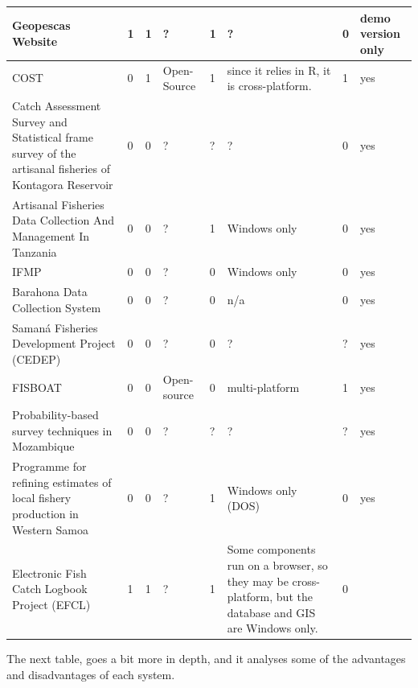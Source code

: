 \documentclass[11pt]{article} %
\begin{document}
\begin{center}
\begin{supertabular}{ | p{0.1\textwidth} | p{0.05\textwidth} | p{0.05\textwidth} | p{0.05\textwidth} | p{0.05\textwidth} | p{0.2\textwidth} | p{0.05\textwidth} | p{0.05\textwidth} |}
Geopescas Website & 1 & 1 & ? & 1 & ? & 0 & demo version only \\ \hline
COST & 0 & 1 & Open-Source & 1 & since it relies in R, it is cross-platform. & 1 & yes \\ \hline
Catch Assessment Survey and Statistical frame survey of the artisanal fisheries of Kontagora Reservoir & 0 & 0 & ? &  & ? & 0 & yes \\ \hline
Artisanal Fisheries Data Collection And Management In Tanzania & 0 & 0 & ? & 1 & Windows only & 0 & yes \\ \hline
IFMP & 0 & 0 & ? & 0 & Windows only & 0 & yes \\ \hline
Barahona Data Collection System & 0 & 0 & ? & 0 & n/a & 0 & yes \\ \hline
Samaná Fisheries Development Project (CEDEP) & 0 & 0 & ? & 0 & ? &  & yes \\ \hline
FISBOAT & 0 & 0 & Open-source & 0 & multi-platform & 1 & yes \\ \hline
Probability-based survey techniques in Mozambique & 0 & 0 & ? &  & ? &  & yes \\ \hline
Programme for refining estimates of local fishery production in Western Samoa & 0 & 0 & ? & 1 & Windows only (DOS) & 0 & yes \\ \hline
Electronic Fish Catch Logbook Project (EFCL) & 1 & 1 & ? & 1 & Some components run on a browser, so they may be cross-platform, but the database and GIS are Windows only. & 0 &  \\ \hline
\end{supertabular}
\end{center}

The next table, goes a bit more in depth, and it analyses some of the advantages and disadvantages of each system. 

\tablelasttail{\hline}
\end{document}
